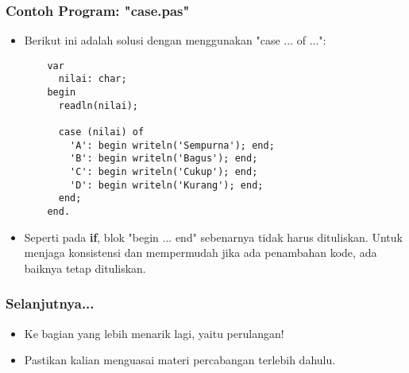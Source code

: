 \begin{frame}[fragile]
\frametitle{Contoh Program: "case.pas"}
\begin{itemize}
  \item Berikut ini adalah solusi dengan menggunakan "case ... of ...":
  \begin{lstlisting}
    var
      nilai: char;
    begin
      readln(nilai);
      
      case (nilai) of
        'A': begin writeln('Sempurna'); end;
        'B': begin writeln('Bagus'); end;
        'C': begin writeln('Cukup'); end;
        'D': begin writeln('Kurang'); end;
      end;
    end.
  \end{lstlisting}
  \item Seperti pada \textbf{if}, blok "begin ... end" sebenarnya tidak harus dituliskan. Untuk menjaga konsistensi dan mempermudah \newline jika ada penambahan kode, ada baiknya tetap dituliskan.
\end{itemize}
\end{frame}

\begin{frame}
\frametitle{Selanjutnya...}
\begin{itemize}
  \item Ke bagian yang lebih menarik lagi, yaitu perulangan!
  \item Pastikan kalian menguasai materi percabangan terlebih dahulu.
\end{itemize}
\end{frame}


